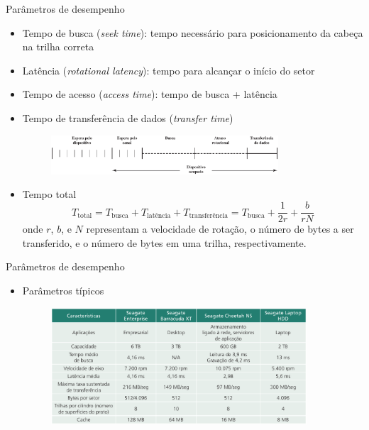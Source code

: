 \begin{slide}{Parâmetros de desempenho}
	\begin{itemize}
		\item Tempo de busca (\emph{seek time}): tempo necessário para posicionamento da cabeça na trilha correta
		\item Latência (\emph{rotational latency}): tempo para alcançar o início do setor
		\item Tempo de acesso (\emph{access time}): tempo de busca + latência
		\item Tempo de transferência de dados (\emph{transfer time})
			\begin{figure}[h]
				\centering
				\includegraphics[width=0.8\textwidth]{figs/temporizacao}
			\end{figure}
		\item Tempo total
			\begin{equation*}
				T_\text{total} = T_\text{busca} + T_\text{latência} + T_\text{transferência} = T_\text{busca} + \frac{1}{2r} + \frac{b}{rN}
			\end{equation*}
			onde $r$, $b$, e $N$ representam a velocidade de rotação, o número de bytes a ser transferido, e o número de bytes em uma trilha, respectivamente.
	\end{itemize}
\end{slide}
\begin{slide}{Parâmetros de desempenho}
	\begin{itemize}
		\item Parâmetros típicos
			\begin{figure}[h]
				\centering
				\includegraphics[width=0.9\textwidth]{figs/parametros-drive}
			\end{figure}
	\end{itemize}
\end{slide}

